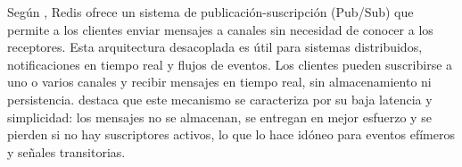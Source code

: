 Según \citeauthor{carlson2013action} \citeyear{carlson2013action}, Redis ofrece un sistema de publicación-suscripción (Pub/Sub) que permite a los clientes enviar mensajes a canales sin necesidad de conocer a los receptores. Esta arquitectura desacoplada es útil para sistemas distribuidos, notificaciones en tiempo real y flujos de eventos. Los clientes pueden suscribirse a uno o varios canales y recibir mensajes en tiempo real, sin almacenamiento ni persistencia. \citeauthor{carlson2013action} \citeyear{carlson2013action} destaca que este mecanismo se caracteriza por su baja latencia y simplicidad: los mensajes no se almacenan, se entregan en mejor esfuerzo y se pierden si no hay suscriptores activos, lo que lo hace idóneo para eventos efímeros y señales transitorias.
